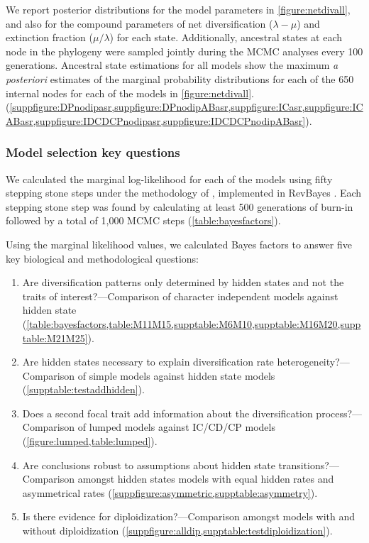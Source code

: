 We report posterior distributions for the model parameters in \cref{figure:netdivall}, and also for the compound parameters of net diversification ($\lambda - \mu$) and extinction fraction ($\mu / \lambda$) for each state.
Additionally, ancestral states at each node in the phylogeny were sampled jointly during the MCMC analyses every 100 generations.
Ancestral state estimations for all models show the maximum \emph{a posteriori} estimates of the marginal probability distributions for each of the 650 internal nodes for each of the models in \cref{figure:netdivall}. (\cref{suppfigure:DPnodipasr,suppfigure:DPnodipABasr,suppfigure:ICasr,suppfigure:ICABasr,suppfigure:IDCDCPnodipasr,suppfigure:IDCDCPnodipABasr}).

\subsubsection{Model selection key questions}

We calculated the marginal log-likelihood for each of the models using fifty stepping stone steps under the methodology of \citet{xie_2010}, implemented in RevBayes \citep{hoehna_2016}.
Each stepping stone step was found by calculating at least 500 generations of burn-in followed by a total of 1,000 MCMC steps (\cref{table:bayesfactors}).

Using the marginal likelihood values, we calculated Bayes factors to answer five key biological and methodological questions:
\begin{enumerate}
\item Are diversification patterns only determined by hidden states and not the traits of interest?---Comparison of character independent models against hidden state (\cref{table:bayesfactors,table:M11M15,supptable:M6M10,supptable:M16M20,supptable:M21M25}).
\item Are hidden states necessary to explain diversification rate heterogeneity?---Comparison of simple models against hidden state models (\cref{supptable:testaddhidden}).
\item Does a second focal trait add information about the diversification process?---Comparison of lumped models against IC/CD/CP models (\cref{figure:lumped,table:lumped}).
\item Are conclusions robust to assumptions about hidden state transitions?---Comparison amongst hidden states models with equal hidden rates and asymmetrical rates (\cref{suppfigure:asymmetric,supptable:asymmetry}).
\item Is there evidence for diploidization?---Comparison amongst models with and without diploidization (\cref{suppfigure:alldip,supptable:testdiploidization}).
\end{enumerate}

